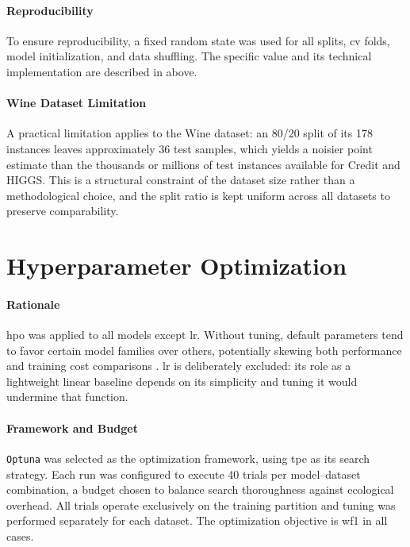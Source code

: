 \paragraph{Reproducibility}
To ensure reproducibility, a fixed random state was used for all splits, \gls{cv} folds, model initialization, and data shuffling. The specific value and its technical implementation are described in  above.

\paragraph{Wine Dataset Limitation}
A practical limitation applies to the Wine dataset: an 80/20 split of its 178 instances leaves approximately 36 test samples, which yields a noisier point estimate than the thousands or millions of test instances available for Credit and HIGGS. This is a structural constraint of the dataset size rather than a methodological choice, and the split ratio is kept uniform across all datasets to preserve comparability.

\section{Hyperparameter Optimization}
\label{implementation_tuning}

\paragraph{Rationale}
\gls{hpo} was applied to all models except \gls{lr}. Without tuning, default parameters tend to favor certain model families over others, potentially skewing both performance and training cost comparisons \cite{bagnallUseDefaultParameter2017}. \gls{lr} is deliberately excluded: its role as a lightweight linear baseline depends on its simplicity and tuning it would undermine that function.

\paragraph{Framework and Budget}
\texttt{Optuna} was selected as the optimization framework, using \gls{tpe} as its search strategy. Each run was configured to execute 40 trials per model--dataset combination, a budget chosen to balance search thoroughness against ecological overhead. All trials operate exclusively on the training partition and tuning was performed separately for each dataset. The optimization objective is \gls{wf1} in all cases.

